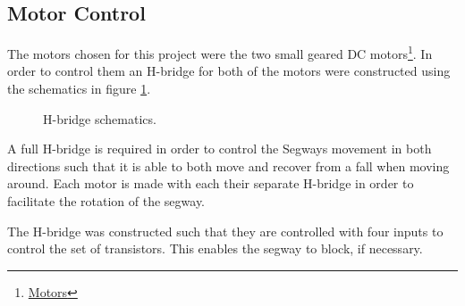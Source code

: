 
\subsection{Motor Control}
The motors chosen for this project were the two small geared DC motors\footnote{ \href{https://www.sparkfun.com/products/13258}{Motors}}.
In order to control them an H-bridge for both of the motors were constructed using the schematics in figure \ref{fig:hbridge}.


\begin{figure}[H]
\centering

\caption{H-bridge schematics.}
\label{fig:hbridge}
\end{figure}

A full H-bridge is required in order to control the Segways movement in both directions such that it is able to both move and recover from a fall when moving around.
Each motor is made with each their separate H-bridge in order to facilitate the rotation of the segway.

The H-bridge was constructed such that they are controlled with four inputs to control the set of transistors.
This enables the segway to block, if necessary.


